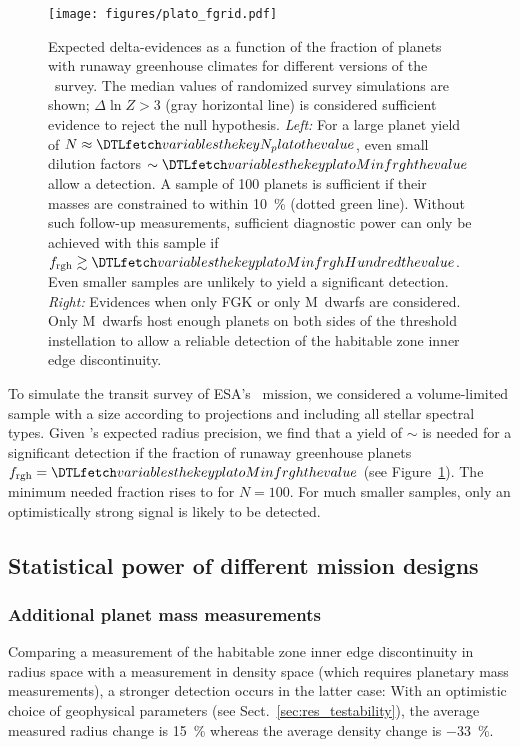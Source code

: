 \documentclass[twocolumn,twocolappendix,linenumbers]{aastex631}
\begin{document}
    \begin{figure*}[ht!]
        \begin{centering}
            \texttt{[image: figures/plato\_fgrid.pdf]}
            \caption{
            Expected delta-evidences as a function of the fraction of planets with runaway greenhouse climates for different versions of the \plato\ survey.
            The median values of randomized survey simulations are shown; $\Delta \ln Z > 3$ (gray horizontal line) is considered sufficient evidence to reject the null hypothesis.
            \textit{Left:} For a large planet yield of $N \approx \var{N_plato}$, even small dilution factors $\sim \var{platoMinfrgh}$ allow a detection.
                A sample of 100 planets is sufficient if their masses are constrained to within \SI{10}{\percent} (dotted green line).
                Without such follow-up measurements, sufficient diagnostic power can only be achieved with this sample if $f_\mathrm{rgh} \gtrsim \var{platoMinfrghHundred}$.
               Even smaller samples are unlikely to yield a significant detection.
            \textit{Right:} Evidences when only FGK or only M~dwarfs are considered.
                Only M~dwarfs host enough planets on both sides of the threshold instellation to allow a reliable detection of the habitable zone inner edge discontinuity.
            }
            \label{fig:plato_fgrid}
        \end{centering}
    \end{figure*}
To simulate the transit survey of ESA's \plato\ mission, we considered a volume-limited sample with a size according to projections and including all stellar spectral types.
Given \plato's expected radius precision, we find that a yield of $\sim$ is needed for a significant detection if the fraction of runaway greenhouse planets $ f_\mathrm{rgh} = \var{platoMinfrgh}$ (see Figure~\ref{fig:plato_fgrid}).
The minimum needed fraction rises to  for $N = 100$.
For much smaller samples, only an optimistically strong signal is likely to be detected.


\subsection{Statistical power of different mission designs}\label{sec:statpower_missions}

\subsubsection{Additional planet mass measurements}\label{sec:res_followup}
Comparing a measurement of the habitable zone inner edge discontinuity in radius space with a measurement in density space (which requires planetary mass measurements), a stronger detection occurs in the latter case:
With an optimistic choice of geophysical parameters (see Sect.~\ref{sec:res_testability}), the average measured radius change is \SI{+15}{\percent} whereas the average density change is \SI{-33}{\percent}.
\end{document}
